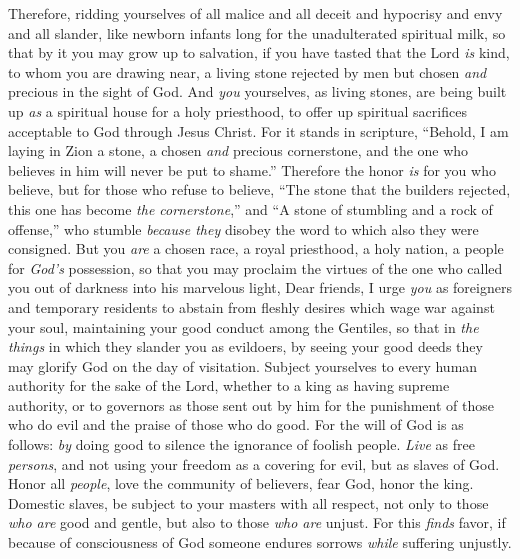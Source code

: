 \begin{biblechapter} %
 Therefore, ridding yourselves of all malice and all deceit and hypocrisy and envy and all slander,
\verse like newborn infants long for the unadulterated spiritual milk, so that by it you may grow up to salvation,
\verse if you have tasted that the Lord \textit{is} kind,
\verse to whom you are drawing near, a living stone rejected by men but chosen \textit{and} precious in the sight of God.
\verse And \textit{you} yourselves, as living stones, are being built up \textit{as} a spiritual house for a holy priesthood, to offer up spiritual sacrifices acceptable to God through Jesus Christ.
\verse For it stands in scripture, “Behold, I am laying in Zion a stone, a chosen \textit{and} precious cornerstone, 
and the one who believes in him will never be put to shame.”
\verse Therefore the honor \textit{is} for you who believe, but for those who refuse to believe, “The stone that the builders rejected, 
this one has become \textit{the cornerstone},”
\verse and “A stone of stumbling and a rock of offense,”
\verse who stumble \textit{because they} disobey the word to which also they were consigned.
\verse But you \textit{are} a chosen race, a royal priesthood, a holy nation, a people for \textit{God’s} possession, so that you may proclaim the virtues of the one who called you out of darkness into his marvelous light,
\verse Dear friends, I urge \textit{you} as foreigners and temporary residents to abstain from fleshly desires which wage war against your soul,
\verse maintaining your good conduct among the Gentiles, so that in \textit{the things} in which they slander you as evildoers, by seeing your good deeds they may glorify God on the day of visitation.
 Subject yourselves to every human authority for the sake of the Lord, whether to a king as having supreme authority,
\verse or to governors as those sent out by him for the punishment of those who do evil and the praise of those who do good.
\verse For the will of God is as follows: \textit{by} doing good to silence the ignorance of foolish people.
\verse \textit{Live} as free \textit{persons}, and not using your freedom as a covering for evil, but as slaves of God.
\verse Honor all \textit{people}, love the community of believers, fear God, honor the king.
\verse Domestic slaves, be subject to your masters with all respect, not only to those \textit{who are} good and gentle, but also to those \textit{who are} unjust.
\verse For this \textit{finds} favor, if because of consciousness of God someone endures sorrows \textit{while} suffering unjustly.

\end{biblechapter}
